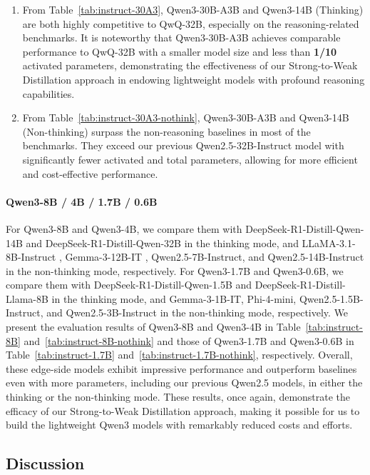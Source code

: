 \documentclass[dvipsnames]{article}
\begin{document}
\begin{enumerate}[label=(\arabic*)]
    \item From Table~\ref{tab:instruct-30A3}, Qwen3-30B-A3B and Qwen3-14B (Thinking) are both highly competitive to QwQ-32B, especially on the reasoning-related benchmarks.
    It is noteworthy that Qwen3-30B-A3B achieves comparable performance to QwQ-32B with a smaller model size and less than \textbf{1/10} activated parameters, demonstrating the effectiveness of our Strong-to-Weak Distillation approach in endowing lightweight models with profound reasoning capabilities.
    \item From Table~\ref{tab:instruct-30A3-nothink}, Qwen3-30B-A3B and Qwen3-14B (Non-thinking) surpass the non-reasoning baselines in most of the benchmarks.
    They exceed our previous Qwen2.5-32B-Instruct model with significantly fewer activated and total parameters, allowing for more efficient and cost-effective performance.
\end{enumerate}

\paragraph{Qwen3-8B / 4B / 1.7B / 0.6B}
For Qwen3-8B and Qwen3-4B, we compare them with DeepSeek-R1-Distill-Qwen-14B and DeepSeek-R1-Distill-Qwen-32B in the thinking mode, and LLaMA-3.1-8B-Instruct \citep{llama3}, Gemma-3-12B-IT \citep{gemma3}, Qwen2.5-7B-Instruct, and Qwen2.5-14B-Instruct in the non-thinking mode, respectively.
For Qwen3-1.7B and Qwen3-0.6B, we compare them with DeepSeek-R1-Distill-Qwen-1.5B and DeepSeek-R1-Distill-Llama-8B in the thinking mode, and Gemma-3-1B-IT, Phi-4-mini, Qwen2.5-1.5B-Instruct, and Qwen2.5-3B-Instruct in the non-thinking mode, respectively.
We present the evaluation results of Qwen3-8B and Qwen3-4B in Table~\ref{tab:instruct-8B} and~\ref{tab:instruct-8B-nothink} and those of Qwen3-1.7B and Qwen3-0.6B in Table~\ref{tab:instruct-1.7B} and~\ref{tab:instruct-1.7B-nothink}, respectively.
Overall, these edge-side models exhibit impressive performance and outperform baselines even with more parameters, including our previous Qwen2.5 models, in either the thinking or the non-thinking mode.
These results, once again, demonstrate the efficacy of our Strong-to-Weak Distillation approach, making it possible for us to build the lightweight Qwen3 models with remarkably reduced costs and efforts.

\subsection{Discussion}
\end{document}
